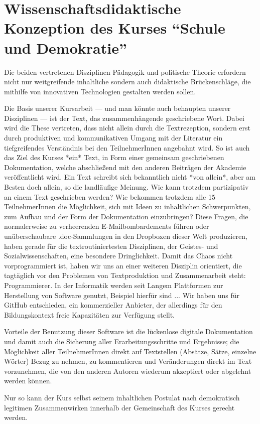 \documentclass[11pt,a4paper,oneside]{article}
\begin{document}
\section{Wissenschaftsdidaktische Konzeption des Kurses ``Schule und Demokratie''}

Die beiden vertretenen Disziplinen Pädagogik und politische Theorie erfordern nicht nur weitgreifende inhaltliche sondern auch didaktische Brückenschläge, die mithilfe von innovativen Technologien gestalten werden sollen.

Die Basis unserer Kursarbeit --- und man könnte auch behaupten unserer Disziplinen --- ist der Text, das zusammenhängende geschriebene Wort.
Dabei wird die These vertreten, dass nicht allein durch die Textrezeption, sondern erst durch produktiven und kommunikativen Umgang mit der Literatur ein tiefgreifendes Verständnis bei den TeilnehmerInnen angebahnt wird.
So ist auch das Ziel des Kurses *ein* Text, in Form einer gemeinsam geschriebenen Dokumentation, welche abschließend mit den anderen Beiträgen der Akademie veröffentlicht wird.
Ein Text schreibt sich bekanntlich nicht *von allein*, aber am Besten doch allein, so die landläufige Meinung.
Wie kann trotzdem partizipativ an einem Text geschrieben werden?
Wie bekommen trotzdem alle 15 TeilnehmerInnen die Möglichkeit, sich mit Ideen zu inhaltlichen Schwerpunkten, zum Aufbau und der Form der Dokumentation einzubringen?
Diese Fragen, die normalerweise zu verheerenden E-Mailbombardements führen oder unüberschaubare .doc-Sammlungen in den Dropboxen dieser Welt produzieren, haben gerade für die textroutiniertesten Disziplinen, der Geistes- und Sozialwissenschaften, eine besondere Dringlichkeit.
Damit das Chaos nicht vorprogrammiert ist, haben wir uns an einer weiteren Disziplin orientiert, die tagtäglich vor den Problemen von Textproduktion und Zusammenarbeit steht: Programmierer.
In der Informatik werden seit Langem Plattformen zur Herstellung von Software genutzt, Beispiel hierfür sind ...
Wir haben uns für GitHub entschieden, ein kommerzieller Anbieter, der allerdings für den Bildungskontext freie Kapazitäten zur Verfügung stellt.

Vorteile der Benutzung dieser Software ist die lückenlose digitale Dokumentation und damit auch die Sicherung aller Erarbeitungsschritte und Ergebnisse; die Möglichkeit aller TeilnehmerInnen direkt auf Textstellen (Absätze, Sätze, einzelne Wörter) Bezug zu nehmen, zu kommentieren und Veränderungen direkt im Text vorzunehmen, die von den anderen Autoren wiederum akzeptiert oder abgelehnt werden können.

Nur so kann der Kurs selbst seinem inhaltlichen Postulat nach demokratisch legitimen Zusammenwirken innerhalb der Gemeinschaft des Kurses gerecht werden.


\printbibliography
\end{document}
